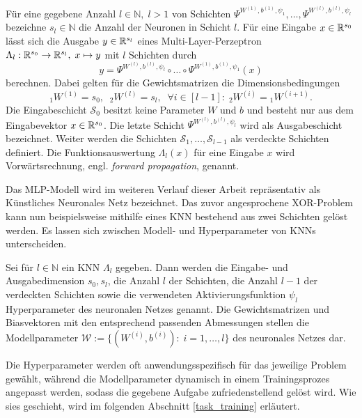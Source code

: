 \begin{defi}
    Für eine gegebene Anzahl $l \in \mathbb{N}, \; l>1$ von Schichten $\Psi^{W^{(1)},b^{(1)},\psi_{1}}, \ldots, \Psi^{W^{(l)},b^{(l)},\psi_{l}}$ bezeichne $s_l \in \mathbb{N}$ die Anzahl der Neuronen in Schicht $l$. Für eine Eingabe $x \in \mathbb{R}^{s_0}$ lässt sich die Ausgabe $y \in \mathbb{R}^{s_l}$ eines Multi-Layer-Perzeptron  $\Lambda_l: \mathbb{R}^{s_0} \rightarrow \mathbb{R}^{s_l}, \; x \mapsto y$ mit $l$ Schichten durch
    \[
        y=\Psi^{W^{(l)},b^{(l)},\psi_{l}} \circ \ldots \circ \Psi^{W^{(1)},b^{(1)},\psi_{1}}(x)
    \]
    berechnen. Dabei gelten für die Gewichtsmatrizen die Dimensionsbedingungen
    \[{}_1W^{(1)}=s_0, \; \; {}_2W^{(l)}=s_l, \; \; \forall i \in [l-1]: \; {}_2W^{(i)}={}_1W^{(i+1)}.
        \] 
    Die Eingabeschicht $\mathcal{S}_0$ besitzt keine Parameter $W$ und $b$ und besteht nur aus dem Eingabevektor $x \in \mathbb{R}^{s_0}$. Die letzte Schicht $\Psi^{W^{(l)},b^{(l)},\psi_{l}}$ wird als Ausgabeschicht bezeichnet. Weiter werden die Schichten $\mathcal{S}_1, \ldots, \mathcal{S}_{l-1}$ als verdeckte Schichten definiert. Die Funktionsauswertung $\Lambda_l(x)$ für eine Eingabe $x$ wird Vorwärtsrechnung, engl. \textit{forward propagation}, genannt.
\end{defi}
Das MLP-Modell wird im weiteren Verlauf dieser Arbeit repräsentativ als Künstliches Neuronales Netz bezeichnet. Das zuvor angesprochene XOR-Problem kann nun beispielsweise mithilfe eines KNN bestehend aus zwei Schichten gelöst werden\cite{Goodfellow-et-al-2016}.
Es lassen sich zwischen Modell- und Hyperparameter von KNNs unterscheiden.

\begin{defi}
    Sei für $l \in \mathbb{N}$ ein KNN $\Lambda_l$ gegeben. Dann werden die Eingabe- und Ausgabedimension $s_0, s_l$, die Anzahl $l$ der Schichten, die Anzahl $l-1$ der verdeckten Schichten sowie die verwendeten Aktivierungsfunktion $\psi_l$ Hyperparameter des neuronalen Netzes genannt.
    Die Gewichtsmatrizen und Biasvektoren mit den entsprechend passenden Abmessungen stellen die Modellparameter $\mathcal{W}:=\{(W^{(i)},b^{(i)}): \; i=1, \ldots, l\}$ des neuronales Netzes dar. 
\end{defi}
Die Hyperparameter werden oft anwendungsspezifisch für das jeweilige Problem gewählt, während die Modellparameter dynamisch in einem Trainingsprozes angepasst werden, sodass die gegebene Aufgabe zufriedenstellend gelöst wird. Wie sies geschieht, wird im folgenden Abschnitt \ref{task_training} erläutert.

